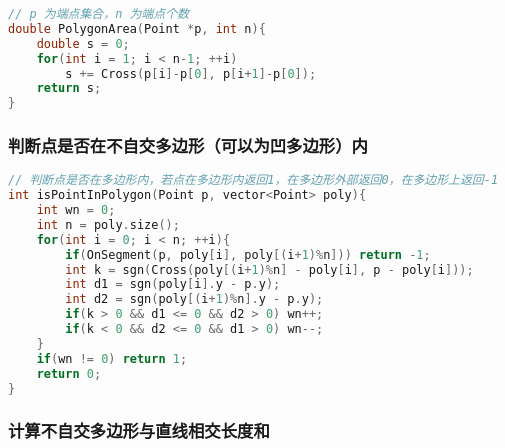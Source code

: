 \begin{lstlisting}[language=C++]
// p 为端点集合，n 为端点个数
double PolygonArea(Point *p, int n){
    double s = 0;
    for(int i = 1; i < n-1; ++i)
        s += Cross(p[i]-p[0], p[i+1]-p[0]);
    return s;
}
\end{lstlisting}

\subsubsection{判断点是否在不自交多边形（可以为凹多边形）内}

\begin{lstlisting}[language=C++]
// 判断点是否在多边形内，若点在多边形内返回1，在多边形外部返回0，在多边形上返回-1
int isPointInPolygon(Point p, vector<Point> poly){
    int wn = 0;
    int n = poly.size();
    for(int i = 0; i < n; ++i){
        if(OnSegment(p, poly[i], poly[(i+1)%n])) return -1;
        int k = sgn(Cross(poly[(i+1)%n] - poly[i], p - poly[i]));
        int d1 = sgn(poly[i].y - p.y);
        int d2 = sgn(poly[(i+1)%n].y - p.y);
        if(k > 0 && d1 <= 0 && d2 > 0) wn++;
        if(k < 0 && d2 <= 0 && d1 > 0) wn--;
    }
    if(wn != 0) return 1;
    return 0;
}
\end{lstlisting}

\subsubsection{计算不自交多边形与直线相交长度和}

